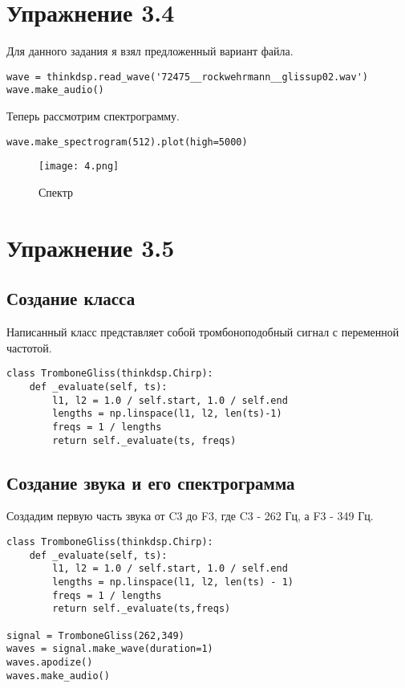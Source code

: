 \documentclass[a4paper,12pt]{report}
\begin{document}
\chapter{Упражнение 3.4}

Для данного задания я взял предложенный вариант файла. 

\begin{lstlisting}[caption=Загрузка]
wave = thinkdsp.read_wave('72475__rockwehrmann__glissup02.wav')
wave.make_audio()
\end{lstlisting}

Теперь рассмотрим спектрограмму.

\begin{lstlisting}[caption=Спектр]
wave.make_spectrogram(512).plot(high=5000)
\end{lstlisting}

\begin{figure}[H]
        \centering
        \texttt{[image: 4.png]}
        \caption{Спектр}
        \label{fig:lab3_fig7}
\end{figure}


\chapter{Упражнение 3.5}
\section{Создание класса}

Написанный класс представляет собой тромбоноподобный сигнал с переменной частотой.

\begin{lstlisting}[caption=Создание класса]
class TromboneGliss(thinkdsp.Chirp):
    def _evaluate(self, ts):
        l1, l2 = 1.0 / self.start, 1.0 / self.end
        lengths = np.linspace(l1, l2, len(ts)-1)
        freqs = 1 / lengths
        return self._evaluate(ts, freqs)
\end{lstlisting}

\section{Создание звука и его спектрограмма}

Создадим первую часть звука от C3 до F3, где C3 - 262 Гц, а F3 - 349 Гц.

\begin{lstlisting}[caption=Создание первой части звука]
class TromboneGliss(thinkdsp.Chirp):
    def _evaluate(self, ts):
        l1, l2 = 1.0 / self.start, 1.0 / self.end
        lengths = np.linspace(l1, l2, len(ts) - 1)
        freqs = 1 / lengths
        return self._evaluate(ts,freqs)
        
signal = TromboneGliss(262,349)
waves = signal.make_wave(duration=1)
waves.apodize()
waves.make_audio()
\end{lstlisting}
\end{document}
